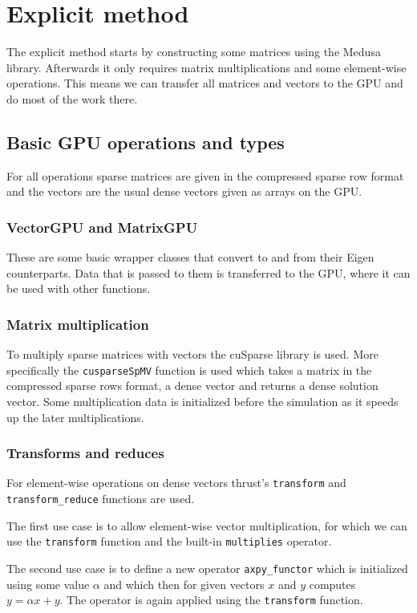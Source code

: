 \documentclass{article}
\begin{document}
\section{Explicit method}
The explicit method starts by constructing some matrices using the Medusa library. Afterwards it 
only requires matrix multiplications and some element-wise operations. This means we can transfer
all matrices and vectors to the GPU and do most of the work there. 

\subsection{Basic GPU operations and types}
For all operations sparse matrices are given in the compressed sparse row format and the vectors
are the usual dense vectors given as arrays on the GPU.
\subsubsection{VectorGPU and MatrixGPU}
These are some basic wrapper classes that convert to and from their Eigen counterparts.
Data that is passed to them is transferred to the GPU, where it can be used with other functions.
\subsubsection{Matrix multiplication}
To multiply sparse matrices with vectors the cuSparse library is used. More specifically the 
\verb|cusparseSpMV| function is used which takes a matrix in the compressed sparse rows format, 
a dense vector and returns a dense solution vector. Some multiplication data is initialized 
before the simulation as it speeds up the later multiplications. 
\subsubsection{Transforms and reduces}
For element-wise operations on dense vectors thrust's \verb|transform| and \verb|transform_reduce| 
functions are used.

The first use case is to allow element-wise vector multiplication, for which we can use 
the \verb|transform| function and the built-in \verb|multiplies| operator.

The second use case is to define a new operator \verb|axpy_functor| which is initialized using some 
value \(\alpha\) and which then for given vectors \(x\) and \(y\) computes \(y = \alpha x + y\).
The operator is again applied using the \verb|transform| function.
\end{document}
